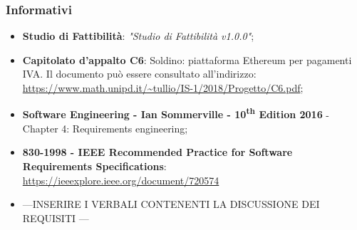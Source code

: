 \subsubsection{Informativi}
\begin{itemize}
	\item \textbf{Studio di Fattibilità}: \textit{"Studio di Fattibilità v1.0.0"};
	\item \textbf{Capitolato d'appalto C6}: Soldino: piattaforma Ethereum per pagamenti IVA. Il documento può essere consultato all'indirizzo: \textsf{\url{ https://www.math.unipd.it/~tullio/IS-1/2018/Progetto/C6.pdf}};
	\item \textbf{Software Engineering - Ian Sommerville - 10\textsuperscript{th} Edition 2016}
	\subitem - Chapter 4: Requirements engineering;
	\item \textbf{830-1998 - IEEE Recommended Practice for Software Requirements Specifications}: \textsf{\url{https://ieeexplore.ieee.org/document/720574}}
	\item ---INSERIRE I VERBALI CONTENENTI LA DISCUSSIONE DEI REQUISITI ---
	
\end{itemize}
